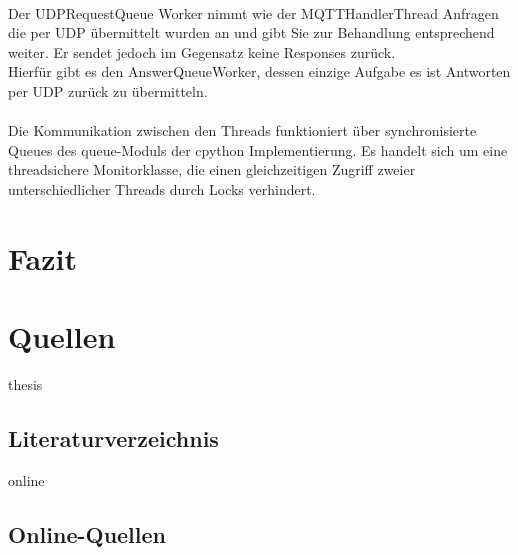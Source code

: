 \documentclass[11pt,a4paper]{report}
\begin{document}
\\
Der UDPRequestQueue Worker nimmt wie der MQTTHandlerThread Anfragen die per UDP übermittelt wurden an und gibt Sie zur Behandlung entsprechend weiter.
Er sendet jedoch im Gegensatz keine Responses zurück.
\\
Hierfür gibt es den AnswerQueueWorker, dessen einzige Aufgabe es ist Antworten per UDP zurück zu übermitteln.
\\\\
Die Kommunikation zwischen den Threads funktioniert über synchronisierte Queues des queue-Moduls\cite{python_queue} der cpython Implementierung.
Es handelt sich um eine threadsichere Monitorklasse, die einen gleichzeitigen Zugriff zweier unterschiedlicher Threads durch Locks verhindert.

\chapter{Fazit}

\chapter{Quellen}



\begin{btSect}{thesis} %
\section*{Literaturverzeichnis}
\btPrintCited
\end{btSect}
\begin{btSect}{online}
\section*{Online-Quellen}
\btPrintCited
%
\end{btSect}
\end{document}
